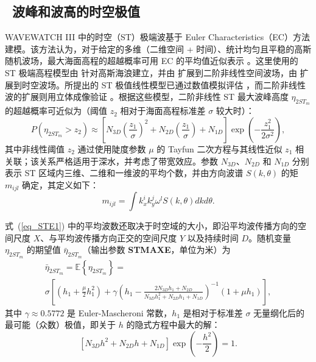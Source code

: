 \vssub
\subsection{~波峰和波高的时空极值} \label{sub:space_time_ext}

WAVEWATCH III 中的时空（ST）极端波基于 Euler Characteristics（EC）方法建模。该方法认为，对于给定的多维（二维空间 + 时间）、统计均匀且平稳的高斯随机波场，最大海面高程的超越概率可用 EC 的平均值近似表示 \citep{Fed12eu}。这里使用的 ST 极端高程模型由 \cite{Fed12sp} 针对高斯海浪建立，并由 \cite{Fed13} 扩展到二阶非线性空间波场，由 \cite{Beet15} 扩展到时空波场。所提出的 ST 极值线性模型已通过数值模拟评估 \citep{Baet15,Baet16}，而二阶非线性波的扩展则用立体成像验证 \citep{Fed13,Beet15}。根据这些模型，二阶非线性 ST 最大波峰高度 $\eta_{2ST_m}$ 的超越概率可近似为（阈值 $z_2$ 相对于海面高程标准差 $\sigma$ 较大时）：
\begin{equation}
P(\eta_{2ST_m} > z_2) \approx \left[N_{3D} \left( \frac{z_1}{\sigma} \right)^{2} + N_{2D} \left( \frac{z_1}{\sigma} \right) + N_{1D} \right] \exp{ \left( -\frac{z_1^2}{2 \sigma^2} \right)},
\label{eq_STE1}
\end{equation}
其中非线性阈值 $z_2$ 通过使用陡度参数 $\mu$ 的 Tayfun 二次方程与其线性近似 $z_1$ 相关联；该关系严格适用于深水，并考虑了带宽效应。参数 $N_{3D}$、$N_{2D}$ 和 $N_{1D}$ 分别表示 ST 区域内三维、二维和一维波的平均个数，并由方向波谱 $S(k, \theta)$ 的矩 $m_{ijl}$ 确定，其定义如下：
\begin{equation}
m_{ijl}=\int k_{x}^{i}k_{y}^{j}\omega^{l}S(k,\theta)dkd\theta.
\label{eq_STE2}
\end{equation}

式~(\ref{eq_STE1}) 中的平均波数还取决于时空域的大小，即沿平均波传播方向的空间尺度 $X$、与平均波传播方向正交的空间尺度 $Y$ 以及持续时间 $D$。随机变量 $\eta_{2ST_m}$ 的期望值 $\bar{\eta}_{2ST_m}$（输出参数 \textbf{STMAXE}，单位为米）为
\begin{multline}
\bar{\eta}_{2ST_m}=\mathbb{E}\left\{\eta_{2ST_m} \right\} = \\ 
	\sigma \left[(h_1+\frac{\mu}{2}h_1^{2})+
\gamma \left( h_1-\frac{2N_{3D}h_1+N_{2D}}{N_{3D} h_1^{2}+N_{2D} h_1+N_{1D}}\right)^{-1} (1+\mu h_1) \right],
\label{eq_STE3}
\end{multline}
其中 $\gamma \approx 0.5772$ 是 Euler-Mascheroni 常数，$h_1$ 是相对于标准差 $\sigma$ 无量纲化后的最可能（众数）极值，即关于 $h$ 的隐式方程中最大的解：
\begin{equation}
\left[N_{3D} h^{2} + N_{2D} h + N_{1D} \right] \exp{ \left( -\frac{h^2}{2} \right)}=1.
\label{eq_STE4}
\end{equation}

